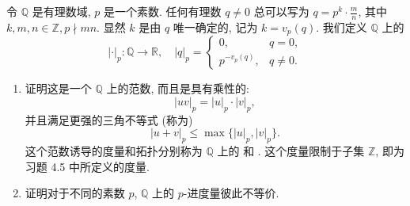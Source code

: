 \documentclass[../main.tex]{subfiles}
\begin{document}
\begin{exercise}{}{}
令 $\mathbb{Q}$ 是有理数域, $p$ 是一个素数. 任何有理数 $q \neq 0$ 总可以写为 $q = p^k \cdot \frac{m}{n}$, 其中 $k, m, n \in \mathbb{Z}, p \nmid mn$. 显然 $k$ 是由 $q$ 唯一确定的, 记为 $k = v_p(q)$. 我们定义 $\mathbb{Q}$ 上的 
\[
|\cdot|_p : \mathbb{Q} \to \mathbb{R}, \quad |q|_p = \begin{cases} 0, & q=0, \\ p^{-v_p(q)}, & q \neq 0. \end{cases}
\]
\begin{enumerate}
    \item 证明这是一个 $\mathbb{Q}$ 上的范数, 而且是具有乘性的:
    \[
    |uv|_p = |u|_p \cdot |v|_p,
    \]
    并且满足更强的三角不等式 (称为)
    \[
    |u+v|_p \le \max\{|u|_p, |v|_p\}.
    \]
    这个范数诱导的度量和拓扑分别称为 $\mathbb{Q}$ 上的  和 . 这个度量限制于子集 $\mathbb{Z}$, 即为习题 4.5 中所定义的度量.
    \item 证明对于不同的素数 $p$, $\mathbb{Q}$ 上的 $p$-进度量彼此不等价.
\end{enumerate}
\end{exercise}
\end{document}
